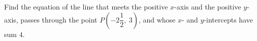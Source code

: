 Find the equation of the line that meets the positive $x$-axis and the positive $y$-axis, passes through the point $P\left(-2\dfrac12,\ 3\right)$, and whose $x$- and $y$-intercepts have sum $4$.
